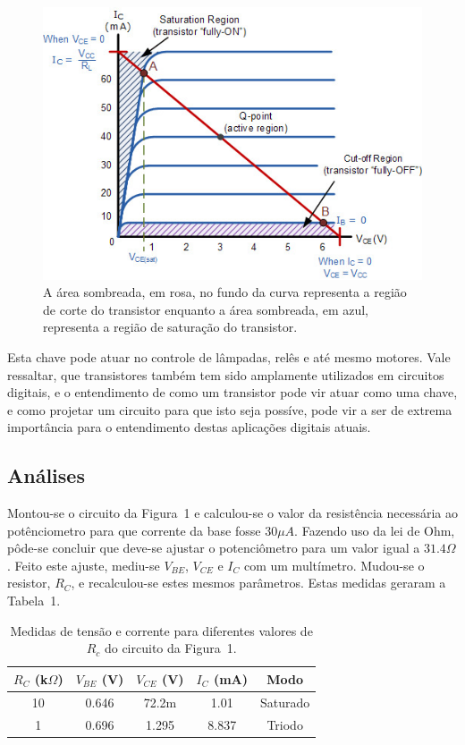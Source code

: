 \documentclass[12pt,a4paper]{article}
\begin{document}
\begin{figure}[htpb]
  \centering
  \includegraphics[width=0.8\linewidth]{./img/tran27.jpeg}
  \caption{A área sombreada, em rosa, no fundo da curva representa a região de corte do transistor enquanto a área sombreada, em azul, representa a região de saturação do transistor.}
  \label{fig:transgraf}
\end{figure}


Esta chave pode atuar no controle de lâmpadas, relês e até mesmo motores.
Vale ressaltar, que transistores também tem sido amplamente utilizados em circuitos digitais, 
e o entendimento  de como um transistor pode vir atuar como uma chave, e como projetar 
um circuito para que isto seja possíve, pode 
vir a ser de extrema importância para o entendimento
destas aplicações digitais atuais. 

\newpage
\subsection{Análises}
Montou-se o circuito da Figura~1 e calculou-se o valor da resistência necessária 
ao  potênciometro para que corrente da base fosse $30 \mu A$.  Fazendo uso da lei
de Ohm, pôde-se concluir que deve-se ajustar o potenciômetro para um valor igual a
$31.4 \Omega$. Feito este ajuste, mediu-se $V_{BE}$, $V_{CE}$ e $I_{C}$ com um multímetro. Mudou-se o resistor, $R_{C}$, e recalculou-se estes 
mesmos parâmetros. Estas medidas geraram a Tabela~1. 
      \begin{table}[H]
        \centering
        \caption{Medidas de tensão e corrente para diferentes valores de $R_{c}$ do circuito da Figura~1.}
        \label{tab:ex1}
        \begin{tabular}{c c c c c}
                          \\ \toprule
        $R_C$ (k$\Omega$)  & $V_{BE}$ (V) & $V_{CE}$ (V) & $I_C$ (mA) & Modo     \\ \midrule
        10                 & 0.646        & 72.2m        & 1.01       & Saturado \\ \midrule
        1                  & 0.696        & 1.295        & 8.837      & Triodo   \\ \bottomrule
        \end{tabular}
        \end{table}
\end{document}
